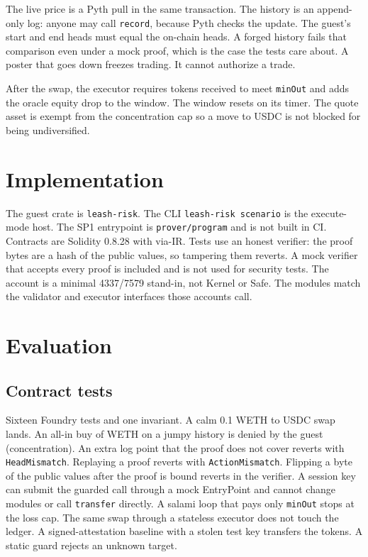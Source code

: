 \documentclass[11pt]{article}
\begin{document}
The live price is a Pyth pull in the same transaction. The history is an append-only log: anyone may call \texttt{record}, because Pyth checks the update. The guest's start and end heads must equal the on-chain heads. A forged history fails that comparison even under a mock proof, which is the case the tests care about. A poster that goes down freezes trading. It cannot authorize a trade.

After the swap, the executor requires tokens received to meet \texttt{minOut} and adds the oracle equity drop to the window. The window resets on its timer. The quote asset is exempt from the concentration cap so a move to USDC is not blocked for being undiversified.

\section{Implementation}

The guest crate is \texttt{leash-risk}. The CLI \texttt{leash-risk scenario} is the execute-mode host. The SP1 entrypoint is \texttt{prover/program} and is not built in CI. Contracts are Solidity 0.8.28 with via-IR. Tests use an honest verifier: the proof bytes are a hash of the public values, so tampering them reverts. A mock verifier that accepts every proof is included and is not used for security tests. The account is a minimal 4337/7579 stand-in, not Kernel or Safe. The modules match the validator and executor interfaces those accounts call.

\section{Evaluation}

\subsection{Contract tests}

Sixteen Foundry tests and one invariant. A calm 0.1 WETH to USDC swap lands. An all-in buy of WETH on a jumpy history is denied by the guest (concentration). An extra log point that the proof does not cover reverts with \texttt{HeadMismatch}. Replaying a proof reverts with \texttt{ActionMismatch}. Flipping a byte of the public values after the proof is bound reverts in the verifier. A session key can submit the guarded call through a mock EntryPoint and cannot change modules or call \texttt{transfer} directly. A salami loop that pays only \texttt{minOut} stops at the loss cap. The same swap through a stateless executor does not touch the ledger. A signed-attestation baseline with a stolen test key transfers the tokens. A static guard rejects an unknown target.
\end{document}
